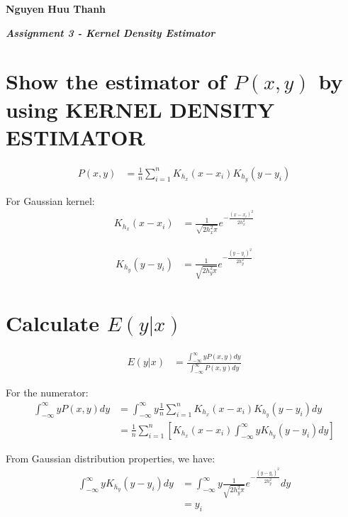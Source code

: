 \documentclass[11pt]{article}
\begin{document}
\textbf{{\huge Nguyen Huu Thanh}}


\textit{\textbf{Assignment 3 - Kernel Density Estimator }}
\vspace{5mm}

\section{Show the estimator of $P(x,y)$ by using KERNEL DENSITY ESTIMATOR}
\begin{equation*} 
\begin{split}
P(x, y)& =\frac{1}{n} \sum_{i=1}^{n} K_{h_x}(x-x_i) K_{h_y}(y-y_i)
\end{split}
\end{equation*}


For Gaussian kernel:
\begin{equation*}
\begin{split}
K_{h_x}(x-x_i) &= \frac{1}{\sqrt{2h_x^2\pi}}e^{-\frac{(x-x_i)^2}{2h_x^2}}
\end{split}
\end{equation*}

\begin{equation*}
\begin{split}
K_{h_y}(y-y_i) &= \frac{1}{\sqrt{2h_y^2\pi}}e^{-\frac{(y-y_i)^2}{2h_y^2}}
\end{split}
\end{equation*}

\section{Calculate $E(y|x)$}
\begin{equation*}
\begin{split}
E(y|x) &= \frac{\int_{-\infty}^{\infty}yP(x,y)dy}{\int_{-\infty}^{\infty}P(x,y)dy}
\end{split}
\end{equation*}


For the numerator:
\begin{equation*}
\begin{split}
\int_{-\infty}^{\infty}yP(x,y)dy &= 
\int_{-\infty}^{\infty}y \frac{1}{n} \sum_{i=1}^{n} K_{h_x}(x-x_i) K_{h_y}(y-y_i)dy \\
&= \frac{1}{n} \sum_{i=1}^{n} [K_{h_x}(x-x_i) \int_{-\infty}^{\infty}y K_{h_y}(y-y_i)dy]
\end{split}
\end{equation*}



From Gaussian distribution properties, we have:
\begin{equation*}
\begin{split}
\int_{-\infty}^{\infty}yK_{h_y}(y-y_i)dy &= \int_{-\infty}^{\infty}y\frac{1}{\sqrt{2h_y^2\pi}}e^{-\frac{(y-y_i)^2}{2h_y^2}}dy \\
&= y_i 
\end{split}
\end{equation*}
\end{document}
